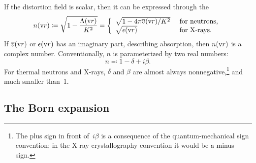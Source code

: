 If the distortion field is scalar,
then it can be expressed through the 
%
%
%
\begin{equation}\label{EnkK}
  n(\text{v}{r})
  \coloneqq\sqrt{1-\frac{\Lambda(\text{v}{r})}{K^2}}
  = \left\{\begin{array}{ll}
       \sqrt{1-4\pi\overline{v}(\text{v}{r})/K^2} &\text{ for neutrons,}\\
       \sqrt{\epsilon(\text{v}{r})} &\text{ for X-rays.}
    \end{array}\right.
\end{equation}
If $\overline{v}(\text{v}{r})$ or $\epsilon(\text{v}{r})$ has an imaginary part, describing absorption,
%
then $n(\text{v}{r})$ is a complex number.
Conventionally, $n$ is parameterized by two real numbers:
\begin{equation}\label{Endb1}
  n \eqqcolon  1-\delta +i\beta.
\end{equation}
%
%
For thermal neutrons and X-rays,
$\delta$ and $\beta$ are almost always nonnegative,\footnote
{The plus sign in front of~$i\beta$ is a consequence of
the quantum-mechanical sign convention;
in the X-ray crystallography convention it would be a minus sign.
%
}
and much smaller than~1.

\subsection{The Born expansion}\label{SBornExpans}

